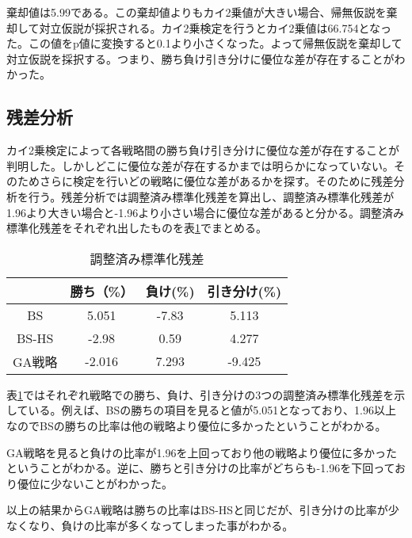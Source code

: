 棄却値は5.99である。この棄却値よりもカイ2乗値が大きい場合、帰無仮説を棄却して対立仮説が採択される。カイ2乗検定を行うとカイ2乗値は66.754となった。この値をp値に変換すると0.1より小さくなった。よって帰無仮説を棄却して対立仮説を採択する。つまり、勝ち負け引き分けに優位な差が存在することがわかった。

\subsection{残差分析}
カイ2乗検定によって各戦略間の勝ち負け引き分けに優位な差が存在することが判明した。しかしどこに優位な差が存在するかまでは明らかになっていない。そのためさらに検定を行いどの戦略に優位な差があるかを探す。そのために残差分析を行う。残差分析では調整済み標準化残差を算出し、調整済み標準化残差が1.96より大きい場合と-1.96より小さい場合に優位な差があると分かる。調整済み標準化残差をそれぞれ出したものを表\ref{score-zansa}でまとめる。

\begin{table}[H]
 \caption{調整済み標準化残差}
 \begin{center}
  \begin{tabular}{|c|c|c|c|}
  \hline   & 勝ち（\%） & 負け(\%)  & 引き分け(\%) \\
  \hline BS & 5.051 & -7.83 & 5.113 \\
  \hline BS-HS & -2.98 & 0.59 & 4.277 \\
  \hline GA戦略 & -2.016 & 7.293 & -9.425 \\
  \hline
  \end{tabular}
  \label{score-zansa}
 \end{center}
\end{table}

表\ref{score-zansa}ではそれぞれ戦略での勝ち、負け、引き分けの3つの調整済み標準化残差を示している。例えば、BSの勝ちの項目を見ると値が5.051となっており、1.96以上なのでBSの勝ちの比率は他の戦略より優位に多かったということがわかる。

GA戦略を見ると負けの比率が1.96を上回っており他の戦略より優位に多かったということがわかる。逆に、勝ちと引き分けの比率がどちらも-1.96を下回っており優位に少ないことがわかった。

以上の結果からGA戦略は勝ちの比率はBS-HSと同じだが、引き分けの比率が少なくなり、負けの比率が多くなってしまった事がわかる。
